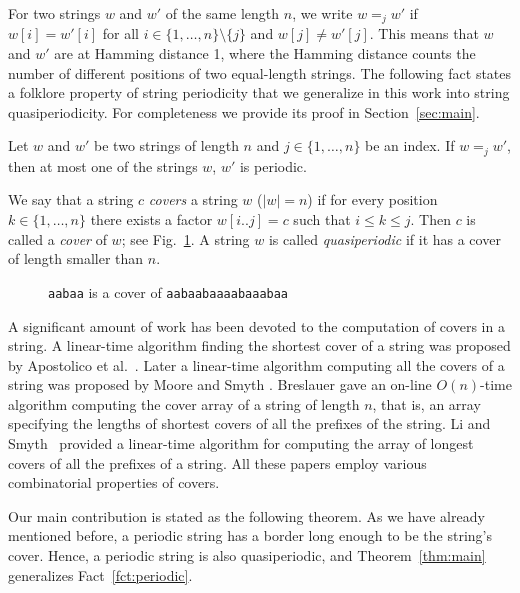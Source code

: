 \documentclass{article}
\begin{document}
  For two strings $w$ and $w'$ of the same length $n$, we write $w =_j w'$ if $w[i]=w'[i]$ for all $i \in \{1,\ldots,n\}\setminus \{j\}$
  and $w[j] \ne w'[j]$.
  This means that $w$ and $w'$ are at Hamming distance 1, where the Hamming distance counts the number of different
  positions of two equal-length strings.
  The following fact states a folklore property of string periodicity that we generalize in this work into string quasiperiodicity.
  For completeness we provide its proof in Section~\ref{sec:main}.

  \begin{fact}\label{fct:periodic}
    Let $w$ and $w'$ be two strings of length $n$ and $j \in \{1,\ldots,n\}$ be an index.
    If $w =_j w'$, then at most one of the strings $w$, $w'$ is periodic.
  \end{fact}

  We say that a string $c$ \emph{covers} a string $w$ ($|w|=n$) if for every position $k \in \{1,\ldots,n\}$
  there exists a factor $w[i..j]=c$ such that $i \le k \le j$.
  Then $c$ is called a \emph{cover} of $w$; see Fig.~\ref{fig:cover}.
  A string $w$ is called \emph{quasiperiodic} if it has a cover of length smaller than $n$.

    \begin{figure}[htpb]
    \begin{center}
    
    \end{center}
    \caption{
      \texttt{aabaa} is a cover of \texttt{aabaabaaaabaaabaa}
    }\label{fig:cover}
    \end{figure}

  A significant amount of work has been devoted to the computation of covers in a string.
  A linear-time algorithm finding the shortest cover of a string was proposed
  by Apostolico et al.\ \cite{DBLP:journals/ipl/ApostolicoFI91}.
  Later a linear-time algorithm computing all the covers of a string was proposed by Moore and Smyth
  \cite{DBLP:conf/soda/MooreS94}.
  Breslauer \cite{DBLP:journals/ipl/Breslauer92} gave an on-line $O(n)$-time algorithm
  computing the cover array of a string of length $n$, that is, an array specifying the lengths
  of shortest covers of all the prefixes of the string.
  Li and Smyth~\cite{DBLP:journals/algorithmica/LiS02} provided a linear-time algorithm
  for computing the array of longest covers of all the prefixes of a string.
  All these papers employ various combinatorial properties of covers.

  Our main contribution is stated as the following theorem.
  As we have already mentioned before, a periodic string has a border long enough to be the string's cover.
  Hence, a periodic string is also quasiperiodic, and Theorem~\ref{thm:main} generalizes Fact~\ref{fct:periodic}.
\end{document}

